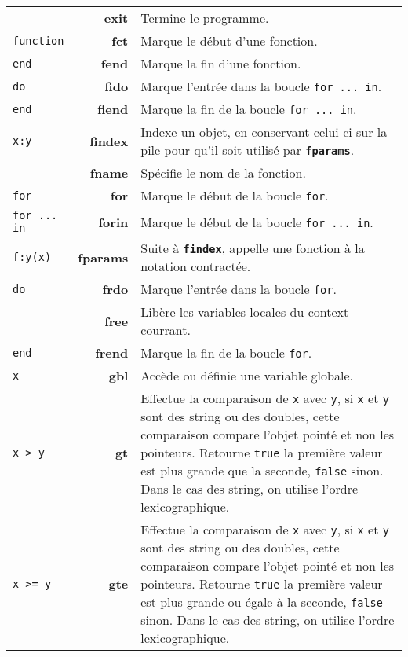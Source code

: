 \documentclass{article}
\begin{document}
\begin{longtable}{p{2cm} r p{12cm}}
  & \textbf{exit} & Termine le programme.\\
  {\lstset{style=lua}\lstinline$function$} & \textbf{fct} & Marque le début d'une fonction.\\
  {\lstset{style=lua}\lstinline$end$} & \textbf{fend} & Marque la fin d'une fonction.\\
  {\lstset{style=lua}\lstinline$do$} & \textbf{fido} & Marque l'entrée dans la boucle {\lstset{style=lua}\lstinline$for ... in$}.\\
  {\lstset{style=lua}\lstinline$end$} & \textbf{fiend} & Marque la fin de la boucle {\lstset{style=lua}\lstinline$for ... in$}.\\
  {\lstset{style=lua}\lstinline$x:y$} & \textbf{findex} & Indexe un objet, en conservant celui-ci sur la pile pour qu'il soit utilisé par \texttt{\textbf{fparams}}.\\
   & \textbf{fname} & Spécifie le nom de la fonction.\\
  {\lstset{style=lua}\lstinline$for$} & \textbf{for} & Marque le début de la boucle {\lstset{style=lua}\lstinline$for$}.\\
  {\lstset{style=lua}\lstinline$for ... in$} & \textbf{forin} & Marque le début de la boucle {\lstset{style=lua}\lstinline$for ... in$}.\\
  {\lstset{style=lua}\lstinline$f:y(x)$} & \textbf{fparams} & Suite à \texttt{\textbf{findex}}, appelle une fonction à la notation contractée. \\
  {\lstset{style=lua}\lstinline$do$} & \textbf{frdo} & Marque l'entrée dans la boucle {\lstset{style=lua}\lstinline$for$}.\\
  & \textbf{free} & Libère les variables locales du context courrant.\\
  {\lstset{style=lua}\lstinline$end$} & \textbf{frend} & Marque la fin de la boucle {\lstset{style=lua}\lstinline$for$}.\\
  {\lstset{style=lua}\lstinline$x$} & \textbf{gbl} & Accède ou définie une variable globale.\\
  {\lstinline$x > y$} & \textbf{gt} & Effectue la comparaison de \texttt{x} avec \texttt{y}, si \texttt{x} et \texttt{y} sont des string ou des doubles, cette comparaison compare l'objet pointé et non les pointeurs. Retourne {\lstset{style=lua}\lstinline$true$} la première valeur est plus grande que la seconde, {\lstset{style=lua}\lstinline$false$} sinon. Dans le cas des string, on utilise l'ordre lexicographique.\\
  {\lstinline$x >= y$} & \textbf{gte} & Effectue la comparaison de \texttt{x} avec \texttt{y}, si \texttt{x} et \texttt{y} sont des string ou des doubles, cette comparaison compare l'objet pointé et non les pointeurs. Retourne {\lstset{style=lua}\lstinline$true$} la première valeur est plus grande ou égale à la seconde, {\lstset{style=lua}\lstinline$false$} sinon. Dans le cas des string, on utilise l'ordre lexicographique.\\

\end{longtable}
\end{document}
